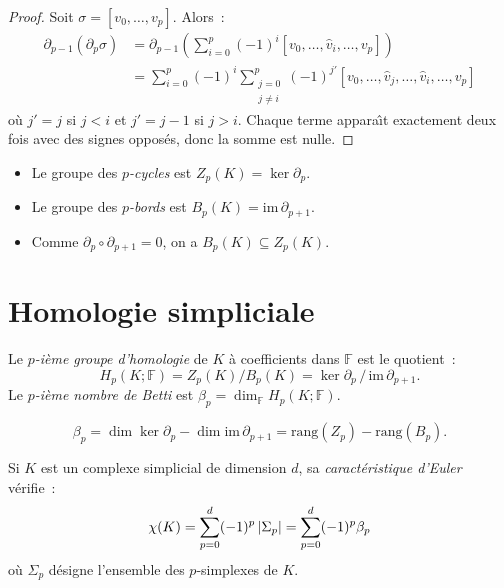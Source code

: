 \begin{proof}
Soit $\sigma = [v_0, \ldots, v_p]$. Alors~:
\begin{align*}
\partial_{p-1}(\partial_p \sigma)
&= \partial_{p-1}\left(\sum_{i=0}^p (-1)^i
   [v_0,\ldots,\hat{v}_i,\ldots,v_p]\right) \\
&= \sum_{i=0}^p (-1)^i \sum_{\substack{j=0 \\ j \neq i}}^p (-1)^{j'}
   [v_0,\ldots,\hat{v}_j,\ldots,\hat{v}_i,\ldots,v_p]
\end{align*}
o\`u $j' = j$ si $j < i$ et $j' = j-1$ si $j > i$. Chaque terme
appara\^{\i}t exactement deux fois avec des signes oppos\'es, donc la
somme est nulle.
\end{proof}

\begin{definition}
\begin{itemize}
  \item Le groupe des \emph{$p$-cycles} est $Z_p(K) = \ker \partial_p$.
  \item Le groupe des \emph{$p$-bords} est $B_p(K) = \mathrm{im}\, \partial_{p+1}$.
  \item Comme $\partial_{p} \circ \partial_{p+1} = 0$, on a
        $B_p(K) \subseteq Z_p(K)$.
\end{itemize}
\end{definition}

\section{Homologie simpliciale}

\begin{definition}
Le \emph{$p$-i\`eme groupe d'homologie} de $K$ \`a coefficients dans
$\mathbb{F}$ est le quotient~:
\[
  H_p(K; \mathbb{F}) = Z_p(K) / B_p(K)
  = \ker \partial_p \,/\, \mathrm{im}\, \partial_{p+1}.
\]
Le \emph{$p$-i\`eme nombre de Betti} est
$\beta_p = \dim_\mathbb{F} H_p(K; \mathbb{F})$.
\end{definition}

\begin{formules}[title=\textbf{Formule des nombres de Betti}]
\[
  \beta_p = \dim \ker \partial_p - \dim \mathrm{im}\, \partial_{p+1}
  = \mathrm{rang}(Z_p) - \mathrm{rang}(B_p).
\]
\end{formules}

\begin{theoreme}
Si $K$ est un complexe simplicial de dimension $d$, sa
\emph{caract\'eristique d'Euler} v\'erifie~:
\[
  \chi(K) = \sum_{p=0}^{d} (-1)^p \left| \Sigma_p \right|
  = \sum_{p=0}^{d} (-1)^p \beta_p
\]
o\`u $\Sigma_p$ d\'esigne l'ensemble des $p$-simplexes de $K$.
\end{theoreme}

